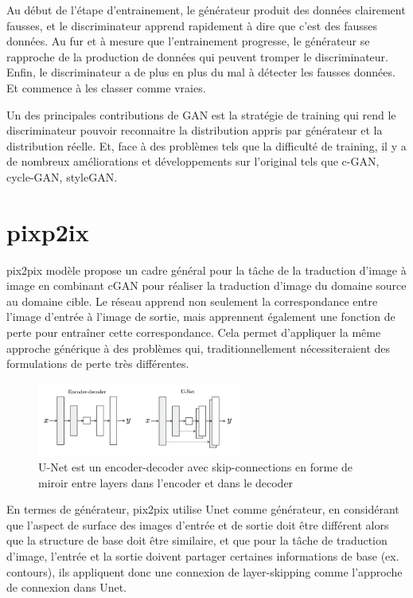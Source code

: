 Au début de l'étape d'entrainement, le générateur produit des données clairement fausses, et le discriminateur apprend rapidement à dire que c'est des fausses données.
Au fur et à mesure que l'entrainement progresse, le générateur se rapproche de la production de données qui peuvent tromper le discriminateur.
Enfin, le discriminateur a de plus en plus du mal à détecter les fausses données. Et commence à les classer comme vraies.


Un des principales contributions de GAN est la stratégie de training qui rend le discriminateur pouvoir reconnaitre la distribution appris par générateur et la distribution réelle. Et, face à des problèmes tels que la difficulté de training, il y a de nombreux améliorations et développements sur l'original tels que c-GAN, cycle-GAN, styleGAN.

\section{pixp2ix} 
pix2pix modèle propose un cadre général pour la tâche de la traduction d'image à image en combinant cGAN pour réaliser la traduction d'image du domaine source au domaine cible. Le réseau apprend non seulement la correspondance entre l'image d'entrée à l'image de sortie, mais apprennent également une fonction de perte pour entraîner cette correspondance. Cela permet d'appliquer la même approche générique à des problèmes qui, traditionnellement nécessiteraient des formulations de perte très différentes\cite{isola2017image}. 

\begin{figure}[H] 
	\centering 
	\includegraphics[width=0.6\textwidth]{./resources/img/Unet.jpg} %
	\caption{ U-Net est un encoder-decoder avec skip-connections en forme de miroir entre layers dans l'encoder et dans le decoder} %
	\label{Fig3_2} %
\end{figure}

En termes de générateur, pix2pix utilise Unet comme générateur, en considérant que l'aspect de surface des images d'entrée et de sortie doit être différent alors que la structure de base doit être similaire, et que pour la tâche de traduction d'image, l'entrée et la sortie doivent partager certaines informations de base (ex. contours), ils appliquent donc une connexion de layer-skipping comme l'approche de connexion dans Unet.

